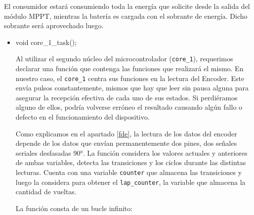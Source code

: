 \begin{itemize} [label = ·]
\begin{enumerate}
                        \par
                    
                        El consumidor estará consumiendo toda la energía que solicite desde la salida del módulo MPPT, mientras la batería es cargada con el sobrante de energía. Dicho sobrante será aprovechado luego.\par
                    
                    \end{enumerate}

                \end{itemize}

                \begin{itemize} [label = ·]
                \setlength{\itemindent}{1.5em}
                
                    \item void core\_1\_task();\par

                    Al utilizar el segundo núcleo del microcontrolador (\texttt{core\_1}), requerimos declarar una función que contenga las funciones que realizará el mismo. En nuestro caso, el \texttt{core\_1} centra sus funciones en la lectura del Encoder. Este envía pulsos constantemente, mismos que hay que leer sin pausa alguna para asegurar la recepción efectiva de cada uno de sus estados. Si perdiéramos alguno de ellos, podría volverse erróneo el resultado causando algún fallo o defecto en el funcionamiento del dispositivo.\par
                    Como explicamos en el apartado \ref{fde}, la lectura de los datos del encoder depende de los datos que envían permanentemente dos pines, dos señales seriales desfasadas 90°. La función considera los valores actuales y anteriores de ambas variables, detecta las transiciones y los ciclos durante las distintas lecturas. Cuenta con una variable \texttt{counter} que almacena las transiciones y luego la considera para obtener el \texttt{lap\_counter}, la variable que almacena la cantidad de vueltas.\par
                    La función consta de un bucle infinito: \par
                    
                    \par 
                    

\end{itemize}
